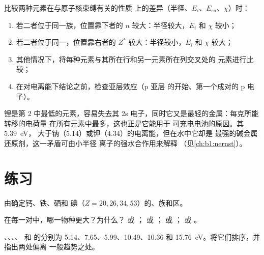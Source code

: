 \begin{method}[由位置预测变化趋势]\label{met:b1:periodicity:predict}
比较两种元素在与原子核束缚有关的性质
上的差异（半径、$E_i$、$E_{ea}$、$\chi$）时：
\begin{enumerate}
  \item 若二者位于同一族，位置靠下者的
        $n$ 较大：半径较大，$E_i$ 和 $\chi$ 较小；
  \item 若二者位于同一，位置靠右者的
        $Z^{*}$ 较大：半径较小，$E_i$ 和 $\chi$ 较大；
  \item 其他情况下，将每种元素与其所在行和另一元素所在列交叉处的
        元素进行比较；
  \item 在对电离能下结论之前，检查亚层效应（p 亚层
        的开始、第一个成对的 p 电子）。
\end{enumerate}
\end{method}

\begin{example}[电池中的锂]\label{ex:b1:periodicity:lithium}
锂是第 2 中最低的元素，容易失去其 2s
电子，同时它又是最轻的金属：每克所能转移的电荷量
在所有元素中最多，这也正是它能用于
可充电电池的原因。其 \qty{5.39}{eV}，
大于钠（5.14）或钾（4.34）的电离能，但在水中它却是
最强的碱金属还原剂，这一矛盾可由小半径  离子的强水合作用来解释
（见\cref{ch:b1:nernst}）。
\end{example}

\section{练习}

\begin{exercise}[$\star$]\label{exo:b1:periodicity:1}
由确定钙、铁、硒和
碘（$Z = 20, 26, 34, 53$）的、族和区。
\end{exercise}

\begin{exercise}[$\star$]\label{exo:b1:periodicity:2}
在每一对中，哪一物种更大？为什么？ 或 ；
 或 ； 或 ； 或 。
\end{exercise}

\begin{exercise}[$\star$]\label{exo:b1:periodicity:3}
、、、、
 和  的分别为 5.14、7.65、5.99、10.49、10.36 和
\qty{15.76}{eV}。将它们排序，并指出两处偏离
一般趋势之处。
\end{exercise}

